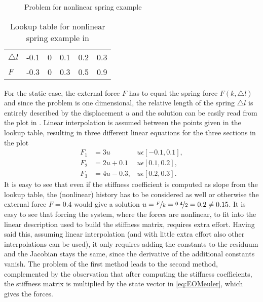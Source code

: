 \begin{figure}
	\centering
	
	\caption{Problem for nonlinear spring example}
	\label{fig:nonlinspring}
\end{figure}
\begin{table}
	\caption{Lookup table for nonlinear spring example in }
	\begin{tabular}{lccccc}
		\toprule
		$\triangle l$ & -0.1 & 0 & 0.1 & 0.2 & 0.3\\
		$F$ & -0.3 & 0 & 0.3 & 0.5 & 0.9 \\
		\bottomrule
	\end{tabular}
	\label{tab:lookup1}
\end{table}

For the static case, the external force $F$ has to equal the spring force $F(k,\triangle l)$ and since the problem is one dimensional, the relative length of the spring $\triangle l$ is entirely described by the  displacement $u$ and the solution  can be easily read from the plot in . 
Linear interpolation is assumed between the points given in the lookup table, resulting in three different linear equations for the three sections in the plot
\begin{align*}
	F_1 &= 3 u &u \epsilon [-0.1,0.1],\\
	F_2 &= 2 u + 0.1 & u \epsilon [0.1,0.2],\\
	F_3 &= 4 u - 0.3, & u \epsilon [0.2,0.3]. 
\end{align*}
It is easy to see that even if the stiffness coefficient is computed as slope from the lookup table, the (nonlinear) history has to be considered as well or otherwise the external force $F = 0.4$ would give a solution $u = \nicefrac{F}{k} = \nicefrac{0.4}{2} = 0.2 \neq 0.15$. It is easy to see that forcing the system, where the forces are nonlinear, to fit into the linear description used to build the stiffness matrix, requires extra effort. 
Having said this, assuming linear interpolation (and with little extra effort also other interpolations can be used), it only requires adding the constants to the residuum and the Jacobian stays the same, since the derivative of the additional constants vanish.
The problem of the first method leads to the second method, complemented by the observation that after computing the stiffness coefficients, the stiffness matrix is multiplied by the state vector in \eqref{eq:EOMeuler}, which gives the forces.


